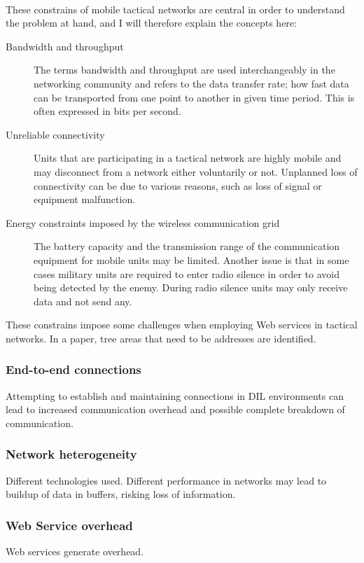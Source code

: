 \documentclass[USenglish]{ifimaster}
\begin{document}
\paragraph{}
These constrains of mobile tactical networks are central in order to understand
the problem at hand, and I will therefore explain the concepts here:
\begin{description}
\item[Bandwidth and throughput] The terms bandwidth and throughput are used
interchangeably in the networking community and refers to the data transfer
rate; how fast data can be transported from one point to another in given time
period. This is often expressed in bits per second.
\item[Unreliable connectivity] Units that are participating in a tactical
network are highly mobile and may disconnect from a network either voluntarily
or not. Unplanned loss of connectivity can be due to various reasons, such as
loss of signal or equipment malfunction.
\item[Energy constraints imposed by the wireless communication grid] The battery
capacity and the transmission range of the communication equipment for mobile
units may be limited. Another issue is that in some cases military units are
required to enter radio silence in order to avoid being detected by the enemy.
During radio silence units may only receive data and not send any.
\end{description}

These constrains impose some challenges when employing Web services in
tactical networks. In a paper, tree areas that need to be addresses are
identified\cite{IST-118}.
\label{section:DIL-problems}

\subsubsection{End-to-end connections}
Attempting to establish and maintaining connections in DIL environments can lead
to increased communication overhead and possible complete breakdown of
communication. \subsubsection{Network heterogeneity}
Different technologies used. Different performance in networks may lead to
buildup of data in buffers, risking loss of information.
\subsubsection{Web Service overhead}
Web services generate overhead.
\end{document}
